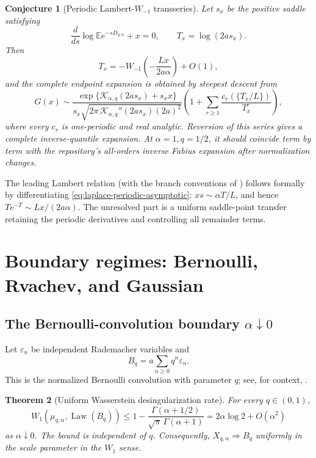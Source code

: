 \documentclass[11pt]{article}
\newtheorem{theorem}{Theorem}[section]
\newtheorem{conjecture}[theorem]{Conjecture}
\theoremstyle{definition}
\theoremstyle{remark}
\newcommand{\E}{\mathbb{E}}
\newcommand{\Kcal}{\mathcal{K}}
\newcommand{\Wm}{W_{-1}}
\begin{document}
\begin{conjecture}[Periodic Lambert-\(W_{-1}\) transseries]
\label{conj:lambert-transseries}
Let \(s_x\) be the positive saddle satisfying
\[
 \frac{d}{ds}\log\E e^{-sD_{q,\alpha}}+x=0,
 \qquad T_x=\log(2as_x).
\]
Then
\begin{equation}
 T_x=-\Wm\!\left(-\frac{Lx}{2a\alpha}\right)+O(1),
 \label{eq:Lambert-leading-saddle}
\end{equation}
and the complete endpoint expansion is obtained by steepest descent from
\begin{equation}
 G(x)\sim
 \frac{\exp\{\Kcal_{\alpha,q}(2as_x)+s_xx\}}
 {s_x\sqrt{2\pi\,\Kcal_{\alpha,q}''(2as_x)(2a)^2}}
 \left(1+\sum_{r\ge1}\frac{c_r(\{T_x/L\})}{T_x^r}\right),
 \label{eq:conjectural-saddle-expansion}
\end{equation}
where every \(c_r\) is one-periodic and real analytic.  Reversion of this
series gives a complete inverse-quantile expansion.  At \(\alpha=1,q=1/2\),
it should coincide term by term with the repository's all-orders inverse
Fabius expansion after normalization changes.
\end{conjecture}

The leading Lambert relation (with the branch conventions of \cite{CorlessLambert}) follows formally by differentiating
\eqref{eq:laplace-periodic-asymptotic}: \(xs\sim\alpha T/L\), and hence
\(Te^{-T}\sim Lx/(2a\alpha)\).  The unresolved part is a uniform saddle-point
transfer retaining the periodic derivatives and controlling all remainder
terms.

\section{Boundary regimes: Bernoulli, Rvachev, and Gaussian}
\label{sec:boundary-regimes}

\subsection{The Bernoulli-convolution boundary \(\alpha\downarrow0\)}

Let \(\varepsilon_n\) be independent Rademacher variables and
\begin{equation}
 B_q=a\sum_{n\ge0}q^n\varepsilon_n.
 \label{eq:bernoulli-convolution}
\end{equation}
This is the normalized Bernoulli convolution with parameter \(q\); see, for context, \cite{PeresSolomyak,Hochman,Shmerkin}.

\begin{theorem}[Uniform Wasserstein desingularization rate]
\label{thm:W1-boundary}
For every \(q\in(0,1)\),
\begin{equation}
 W_1(\mu_{q,\alpha},\operatorname{Law}(B_q))
 \le 1-\frac{\Gamma(\alpha+1/2)}{\sqrt\pi\,\Gamma(\alpha+1)}
 =2\alpha\log2+O(\alpha^2)
 \label{eq:W1-bound}
\end{equation}
as \(\alpha\downarrow0\).  The bound is independent of \(q\).
Consequently, \(X_{q,\alpha}\Rightarrow B_q\) uniformly in the scale
parameter in the \(W_1\) sense.
\end{theorem}
\end{document}
